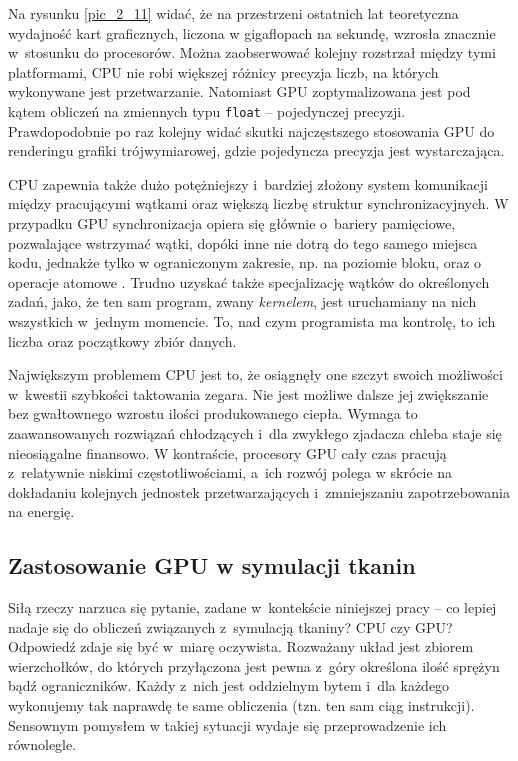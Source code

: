 		
		Na rysunku \ref{pic_2_11} widać, że na przestrzeni ostatnich lat teoretyczna wydajność kart graficznych, liczona w gigaflopach na sekundę, wzrosła znacznie w~stosunku do procesorów. Można zaobserwować kolejny rozstrzał między tymi platformami, CPU nie robi większej różnicy precyzja liczb, na których wykonywane jest przetwarzanie. Natomiast GPU zoptymalizowana jest pod kątem obliczeń na zmiennych typu \texttt{float} -- pojedynczej precyzji. Prawdopodobnie po raz kolejny widać skutki najczęstszego stosowania GPU do renderingu grafiki trójwymiarowej, gdzie pojedyncza precyzja jest wystarczająca.
		
		CPU zapewnia także dużo potężniejszy i~bardziej złożony system komunikacji między pracującymi wątkami oraz większą liczbę struktur synchronizacyjnych. W przypadku GPU synchronizacja opiera się głównie o~bariery pamięciowe, pozwalające wstrzymać wątki, dopóki inne nie dotrą do tego samego miejsca kodu, jednakże tylko w ograniczonym zakresie, np. na poziomie bloku, oraz o operacje atomowe \cite{cuda}. Trudno uzyskać także specjalizację wątków do określonych zadań, jako, że ten sam program, zwany \emph{kernelem}, jest uruchamiany na nich wszystkich w~jednym momencie. To, nad czym programista ma kontrolę, to ich liczba oraz początkowy zbiór danych.
		
		Największym problemem CPU jest to, że osiągnęły one szczyt swoich możliwości w~kwestii szybkości taktowania zegara. Nie jest możliwe dalsze jej zwiększanie bez gwałtownego wzrostu ilości produkowanego ciepła. Wymaga to zaawansowanych rozwiązań chłodzących i~dla zwykłego zjadacza chleba staje się nieosiągalne finansowo. W kontraście, procesory GPU cały czas pracują z~relatywnie niskimi częstotliwościami, a~ich rozwój polega w skrócie na dokładaniu kolejnych jednostek przetwarzających i~zmniejszaniu zapotrzebowania na energię.
		
		\subsection{Zastosowanie GPU w symulacji tkanin}
		\label{t:teoria:gpu:zalety}
		
		Siłą rzeczy narzuca się pytanie, zadane w~kontekście niniejszej pracy -- co lepiej nadaje się do obliczeń związanych z~symulacją tkaniny? CPU czy GPU? Odpowiedź zdaje się być w~miarę oczywista. Rozważany układ jest zbiorem wierzchołków, do których przyłączona jest pewna z~góry określona ilość sprężyn bądź ograniczników. Każdy z~nich jest oddzielnym bytem i~dla każdego wykonujemy tak naprawdę te same obliczenia (tzn. ten sam ciąg instrukcji). Sensownym pomysłem w takiej sytuacji wydaje się przeprowadzenie ich równolegle. 
		
